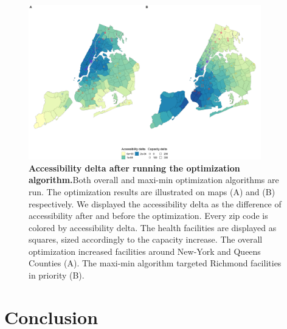\begin{figure}[h!]
    \includegraphics[width=0.9\textwidth]{images/camion-ny/fig3.png}
    \centering
    \caption{ \textbf{Accessibility delta after running the optimization
            algorithm.}Both overall and maxi-min optimization algorithms are run.
        The optimization results are illustrated on maps (A) and (B)
        respectively. We displayed the accessibility delta as the difference of
        accessibility after and before the optimization. Every zip code is
        colored by accessibility delta. The health facilities are displayed as
        squares, sized accordingly to the capacity increase. The overall
        optimization increased facilities around New-York and Queens Counties
        (A). The maxi-min algorithm targeted Richmond facilities in priority
        (B). }
    \label{fig:camion-ny-optim}
\end{figure}

\section{Conclusion}

